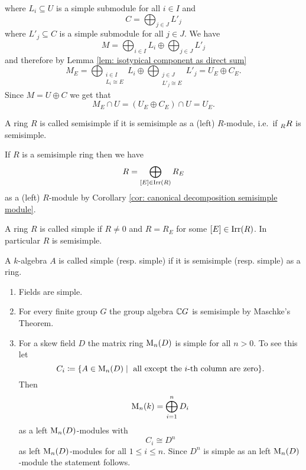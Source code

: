 \begin{rem}
\begin{enumerate}[label=\emph{\alph*})]
  where $L_i \subseteq U$ is a simple submodule for all $i \in I$ and
  \[
   C = \bigoplus_{j \in J} L'_j
  \]
  where $L'_j \subseteq C$ is a simple submodule for all $j \in J$. We have
  \[
   M = \bigoplus_{i \in I} L_i \oplus \bigoplus_{j \in J} L'_j
  \]
  and therefore by Lemma \ref{lem: isotypical component as direct sum}
  \[
   M_E
   = \bigoplus_{\substack{i \in I \\ L_i \cong E}} L_i \oplus \bigoplus_{\substack{j \in J \\ L'_j \cong E}} L'_j
   = U_E \oplus C_E.
  \]
  Since $M = U \oplus C$ we get that
  \[
   M_E \cap U = (U_E \oplus C_E) \cap U = U_E.
  \]
 \end{enumerate}
\end{rem}


\begin{defi}
 A ring $R$ is called semisimple if it is semisimple as a (left) $R$-module, i.e.\ if $\prescript{}{R}{R}$ is semisimple.
\end{defi}


If $R$ is a semisimple ring then we have
\[
 R = \bigoplus_{[E] \in \operatorname{Irr}(R)} R_E
\]
as a (left) $R$-module by Corollary \ref{cor: canonical decomposition semisimple module}.


\begin{defi}
 A ring $R$ is called simple if $R \neq 0$ and $R = R_E$ for some \mbox{$[E] \in \operatorname{Irr}(R)$}. In particular $R$ is semisimple.
\end{defi}


\begin{defi}
 A $k$-algebra $A$ is called simple (resp. simple) if it is semisimple (resp. simple) as a ring.
\end{defi}


\begin{expls}
 \begin{enumerate}[label=\emph{\alph*})]
  \item
  Fields are simple.
  \item
  For every finite group $G$ the group algebra $\mathbb{C} G$ is semisimple by Maschke’s Theorem.
  \item
  For a skew field $D$ the matrix ring $\operatorname{M}_n(D)$ is simple for all $n > 0$. To see this let
  \[
   C_i
   \coloneqq \{ A \in \operatorname{M}_n(D) \mid \text{ all except the $i$-th column are zero} \}.
  \]
  Then
  \[
   \operatorname{M}_n(k) = \bigoplus_{i=1}^n D_i
  \]
  as a left $\operatorname{M}_n(D)$-modules with
  \[
   C_i \cong D^n
  \]
  as left $\operatorname{M}_n(D)$-modules for all $1 \leq i \leq n$. Since $D^n$ is simple as an left $\operatorname{M}_n(D)$-module the statement follows.
 \end{enumerate}
\end{expls}


